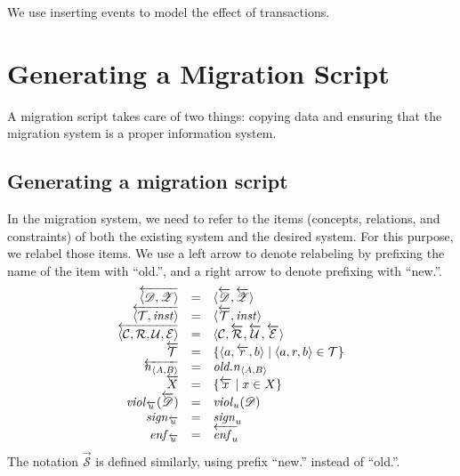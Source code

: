 \documentclass[runningheads]{llncs}
\newcommand{\id}[1]{\text{\it #1\/}}
\newcommand{\instance}{\mathbin{\id{inst}}}
\newcommand{\viol}[2]{\violC{#1}(#2)}
\newcommand{\violC}[1]{\id{viol}_{#1}}
\newcommand{\sign}[1]{\id{sign}_{#1}}
\newcommand{\enfRel}[1]{\id{enf}_{#1}}
\newcommand{\declare}[3]{\id{#1}_{\pair{#2}{#3}}}
\newcommand{\pair}[2]{\langle{#1},{#2}\rangle}
\newcommand{\triple}[3]{\langle{#1},{#2},{#3}\rangle}
\newcommand{\quadruple}[4]{\langle{#1},{#2},{#3},{#4}\rangle}
\newcommand{\concepts}{\mathcal{C}}
\newcommand{\rels}{\mathcal{R}}   %
\newcommand{\triples}{\mathcal{T}}
\newcommand{\transactions}{\mathcal{E}}
\newcommand{\rules}{\mathcal{U}}
\newcommand{\dataset}{\mathscr{D}}
\newcommand{\schema}{\mathscr{Z}}
\newcommand{\infsys}{\mathscr{S}}
\begin{document}
   We use inserting events to model the effect of transactions.

\section{Generating a Migration Script}
   A migration script takes care of two things: copying data and ensuring that the migration system is a proper information system.
\subsection{Generating a migration script}
   In the migration system, we need to refer to the items (concepts, relations, and constraints) of both the existing system and the desired system.
   For this purpose, we relabel those items.
   We use a left arrow to denote relabeling by prefixing the name of the item with ``old.'', and a right arrow to denote prefixing with ``new.''.
\begin{equation}
   \begin{array}[m]{rcl}
      \overleftarrow{\pair{\dataset}{\schema}}&=&\pair{\overleftarrow{\dataset}}{\overleftarrow{\schema}}\\
      \overleftarrow{\pair{\triples}{\instance}}&=&\pair{\overleftarrow{\triples}}{\instance}\\
      \overleftarrow{\quadruple{\concepts}{\rels}{\rules}{\transactions}}&=&\quadruple{\concepts}{\overleftarrow{\rels}}{\overleftarrow{\rules}}{\overleftarrow{\transactions}}\\
      \overleftarrow{\triples}&=&\{\triple{a}{\overleftarrow{r}}{b}\mid\triple{a}{r}{b}\in\triples\}\\
      \overleftarrow{\declare{n}{A}{B}}&=&\declare{old.n}{A}{B}\\
      \overleftarrow{X}&=&\{\overleftarrow{x}\mid x\in X\}\\
      \viol{\overleftarrow{u}}{\overleftarrow{\dataset}}&=&\viol{u}{\dataset}\\
      \sign{\overleftarrow{u}}&=&\sign{u}\\
      \enfRel{\overleftarrow{u}}&=&\overleftarrow{\enfRel{u}}
   \end{array}
\end{equation}
   The notation $\overrightarrow{\infsys}$ is defined similarly, using prefix ``new.'' instead of ``old.''.
\end{document}
